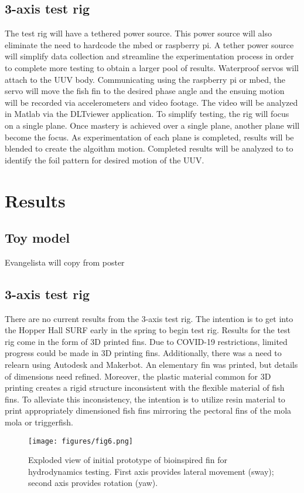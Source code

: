 \documentclass[twocolumn,10pt]{IEEEtran}
\begin{document}
\subsection{3-axis test rig}
The test rig will have a tethered power source.  This power source will also eliminate the need to hardcode the mbed or raspberry pi.  A tether power source will simplify data collection and streamline the experimentation process in order to complete more testing to obtain a larger pool of results.  Waterproof servos will attach to the UUV body.  Communicating using the raspberry pi or mbed, the servo will move the fish fin to the desired phase angle and the ensuing motion will be recorded via accelerometers and video footage.  The video will be analyzed in Matlab via the DLTviewer application.  To simplify testing, the rig will focus on a single plane.  Once mastery is achieved over a single plane, another plane will become the focus.  As experimentation of each plane is completed, results will be blended to create the algoithm motion.  Completed results will be analyzed to to identify the foil pattern for desired motion of the UUV. 
\section{Results}
\subsection{Toy model}
Evangelista will copy from poster
\subsection{3-axis test rig}
There are no current results from the 3-axis test rig.  The intention is to get into the Hopper Hall SURF early in the spring to begin test rig.  Results for the test rig come in the form of 3D printed fins.  Due to COVID-19 restrictions, limited progress could be made in 3D printing fins.  Additionally, there was a need to relearn using Autodesk and Makerbot.  An elementary fin was printed, but details of dimensions need refined.  Moreover, the plastic material common for 3D printing creates a rigid structure inconsistent with the flexible material of fish fins.  To alleviate this inconsistency, the intention is to utilize resin material to print appropriately dimensioned fish fins mirroring the pectoral fins of the mola mola or triggerfish.

\begin{figure}
\begin{center}
\texttt{[image: figures/fig6.png]}
\end{center}
\caption{Exploded view of initial prototype of bioinspired fin for hydrodynamics testing. First axis provides lateral movement (sway); second axis provides rotation (yaw).}
\end{figure}
\end{document}
